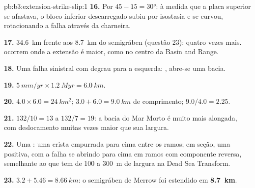 \begin{solution}{pb:b3:extension-strike-slip:1}
\textbf{16.} Por $45 - 15 = \ang{30}$: à medida que a placa superior se afastava, o
bloco inferior descarregado subiu por isostasia e se curvou, rotacionando a falha através da
charneira.

\textbf{17.} \qty{34.6}{km} frente aos \qty{8.7}{km} do semigráben (questão
23): quatro vezes mais.  ocorrem onde a extensão é maior, como no
centro da Basin and Range.

\textbf{18.} Uma falha sinistral com degrau para a esquerda: , abre-se uma bacia.

\textbf{19.} $\qty{5}{mm/yr}\times\qty{1.2}{Myr} = \qty{6.0}{km}$.

\textbf{20.} $4.0\times6.0 = \qty{24}{km^2}$; $3.0 + 6.0 = \qty{9.0}{km}$ de comprimento;
$9.0/4.0 = 2.25$.

\textbf{21.} $132/10 = 13$ a $132/7 = 19$: a bacia do Mar Morto é muito mais
alongada, com deslocamento muitas vezes maior que sua largura.

\textbf{22.} Uma : uma crista empurrada para cima entre os ramos; em
seção, uma  positiva, com a falha se abrindo para cima em ramos
com componente reversa, semelhante ao que tem de 100 a \qty{300}{m} de largura na Dead
Sea Transform.

\textbf{23.} $3.2 + 5.46 = \qty{8.66}{km}$: o semigráben de Merrow foi
estendido em \textbf{\qty[text-series-to-math=true]{8.7}{km}}.
\end{solution}
